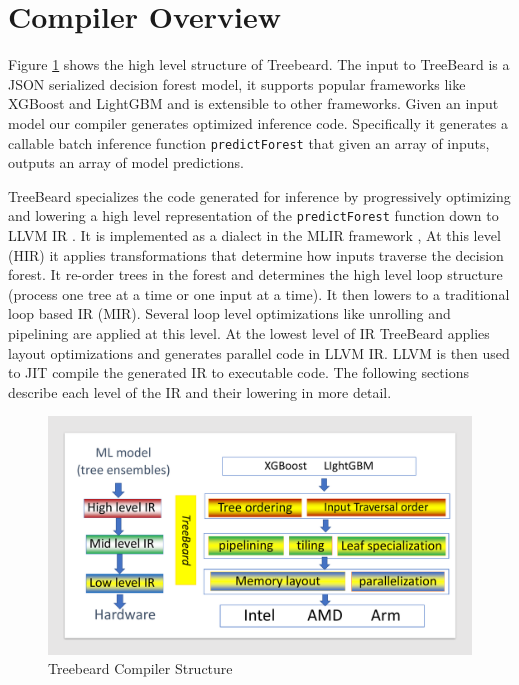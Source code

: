 \section{Compiler Overview}
Figure \ref{Fig:CompilerStructure} shows the high level structure of Treebeard. 
The input to TreeBeard is a JSON serialized decision forest model, it supports popular frameworks like XGBoost and LightGBM and is extensible to other frameworks.
Given an input model our compiler generates optimized inference code. Specifically it generates a callable batch inference function \texttt{predictForest} that given an array of inputs, outputs an array of model predictions. 
 
TreeBeard specializes the code generated for inference by progressively optimizing and lowering a high level representation of the \texttt{predictForest} function down to LLVM IR \cite{LLVM}.
It is implemented as a dialect in the MLIR framework \cite{MLIR},
 At this level (HIR) it applies transformations that determine how inputs traverse the decision forest. It re-order trees in the forest and determines the high level loop structure (process one tree at a time or one input at a time). It then lowers to a traditional loop based IR (MIR). Several loop level optimizations like unrolling and pipelining are applied at this level. At the lowest level of IR TreeBeard applies layout optimizations and generates parallel code in LLVM IR. 
LLVM is then used to JIT compile the generated IR to executable code. The following sections describe each level of the IR and their lowering in more detail.



\begin{figure}
  \centering
  \includegraphics[width=\linewidth]{figures/compiler.pdf}
  \caption{Treebeard Compiler Structure}
  \label{Fig:CompilerStructure}
\end{figure}

